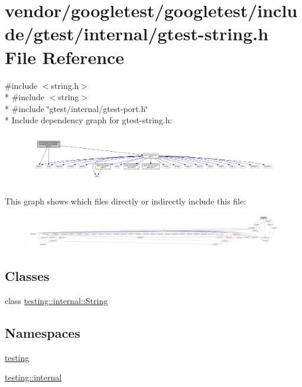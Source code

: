 \hypertarget{gtest-string_8h}{}\section{vendor/googletest/googletest/include/gtest/internal/gtest-\/string.h File Reference}
\label{gtest-string_8h}
{\ttfamily \#include $<$string.\+h$>$}\\*
{\ttfamily \#include $<$string$>$}\\*
{\ttfamily \#include \char`\"{}gtest/internal/gtest-\/port.\+h\char`\"{}}\\*
Include dependency graph for gtest-\/string.h\+:
\nopagebreak
\begin{figure}[H]
\begin{center}
\leavevmode
\includegraphics[width=350pt]{gtest-string_8h__incl}
\end{center}
\end{figure}
This graph shows which files directly or indirectly include this file\+:
\nopagebreak
\begin{figure}[H]
\begin{center}
\leavevmode
\includegraphics[width=350pt]{gtest-string_8h__dep__incl}
\end{center}
\end{figure}
\subsection*{Classes}
\begin{DoxyCompactItemize}
\item 
class \hyperlink{classtesting_1_1internal_1_1String}{testing\+::internal\+::\+String}
\end{DoxyCompactItemize}
\subsection*{Namespaces}
\begin{DoxyCompactItemize}
\item 
 \hyperlink{namespacetesting}{testing}
\item 
 \hyperlink{namespacetesting_1_1internal}{testing\+::internal}
\end{DoxyCompactItemize}
